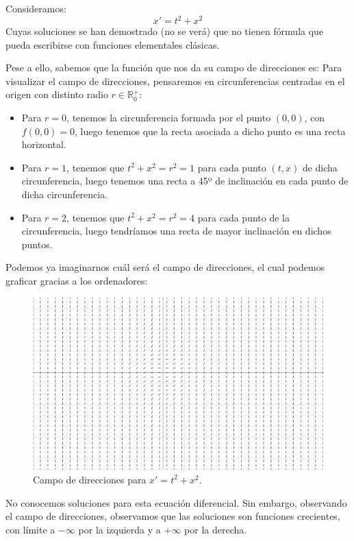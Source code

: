 \begin{ejemplo}
    Consideramos:
    \begin{equation*}
        x' = t^2 + x^2
    \end{equation*}
    Cuyas soluciones se han demostrado (no se verá) que no tienen fórmula que pueda escribirse con funciones elementales clásicas.

    Pese a ello, sabemos que la función que nos da su campo de direcciones es:
    Para visualizar el campo de direcciones, pensaremos en circunferencias centradas en el origen con distinto radio $r\in \mathbb{R}^+_0$:
    \begin{itemize}
        \item Para $r = 0$, tenemos la circunferencia formada por el punto $(0,0)$, con $f(0,0) = 0$, luego tenemos que la recta asociada a dicho punto es una recta horizontal.
        \item Para $r = 1$, tenemos que $t^2 + x^2 = r^2 = 1$ para cada punto $(t,x)$ de dicha circunferencia, luego tenemos una recta a 45º de inclinación en cada punto de dicha circunferencia.
        \item Para $r = 2$, tenemos que $t^2 + x^2 = r^2 = 4$ para cada punto de la circunferencia, luego tendríamos una recta de mayor inclinación en dichos puntos.
    \end{itemize}
    Podemos ya imaginarnos cuál será el campo de direcciones, el cual podemos graficar gracias a los ordenadores:
    \begin{figure}[H]
        \centering
        \includegraphics[width=0.6\linewidth]{Imagenes/campo_direcciones_4.png}
        \caption{Campo de direcciones para $x'=t^2+x^2$.}
    \end{figure}
    No conocemos soluciones para esta ecuación diferencial. Sin embargo, observando el campo de direcciones, observamos que las soluciones son funciones crecientes, con límite a $-\infty$ por la izquierda y a $+\infty$ por la derecha.
\end{ejemplo}


